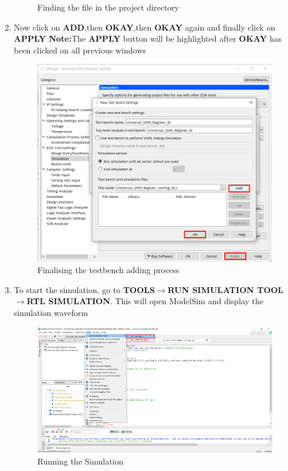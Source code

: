 \documentclass[12pt]{article}
\begin{document}
\begin{enumerate}
\begin{figure}[H]
        \caption{Finding the file in the project directory}
    \end{figure}
    \item Now click on \textbf{ADD},then \textbf{OKAY},then \textbf{OKAY} again and finally click on \textbf{APPLY}
    \textbf{Note:}The \textbf{APPLY} button will be highlighted after \textbf{OKAY} has been clicked on all previous windows
     \begin{figure}[H]
        \centering
         \includegraphics[scale=0.45]{usr14.png}
        \caption{Finalising the testbench adding process}
    \end{figure}
    \newpage
    \item To start the simulation, go to \textbf{TOOLS$\rightarrow$RUN SIMULATION TOOL$\rightarrow$RTL SIMULATION}. This will open ModelSim and display the simulation waveform
     \begin{figure}[H]
        \centering
        \includegraphics[scale=0.4]{usr15.png}
        \caption{Running the Simulation}
    \end{figure}
\end{enumerate}
\newpage
\end{document}
